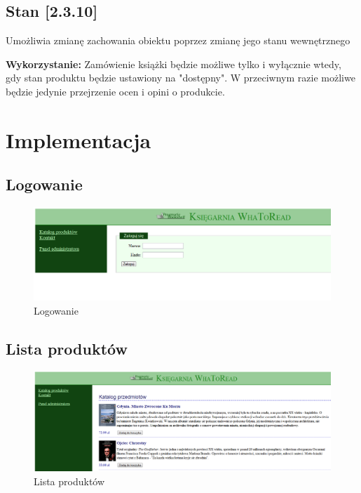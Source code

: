 \documentclass[pdflatex,11pt]{aghdpl}
\begin{document}
\section{Stan [2.3.10]}

Umożliwia zmianę zachowania obiektu poprzez zmianę jego stanu wewnętrznego

\textbf{Wykorzystanie:} Zamówienie książki będzie możliwe tylko i wyłącznie wtedy, gdy stan produktu będzie ustawiony na "dostępny". W przeciwnym razie możliwe będzie jedynie przejrzenie ocen i opini o produkcie.


\chapter{Implementacja}

\section{Logowanie}

\begin{figure}[!h]
\centering
\includegraphics[width=\textwidth]{logowanie}
\caption{Logowanie}
\label{fig:logowanie}
\end{figure}



\section{Lista produktów}

\begin{figure}[!h]
\centering
\includegraphics[width=\textwidth]{lista_produktow}
\caption{Lista produktów}
\label{fig:lista_produktow}
\end{figure}
\end{document}
